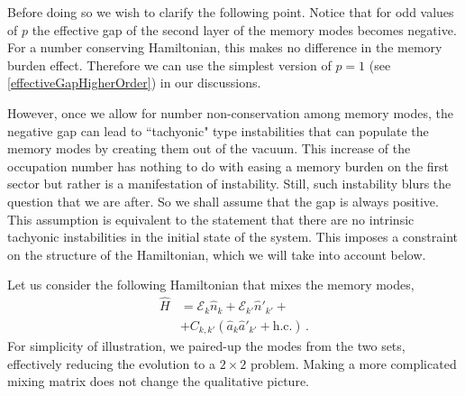 \documentclass[aps,prd,reprint,superscriptaddress,nofootinbib]{revtex4-2}
\begin{document}
  Before doing so we wish to clarify the following point. 
	Notice that for odd values of $p$ the effective gap 
	of the second layer of the memory modes becomes negative. 
	For a number conserving  Hamiltonian, this makes no difference 
	in the memory burden effect. 
	Therefore we can use the 
	simplest version of $p=1$ (see \eqref{effectiveGapHigherOrder}) in our 
discussions. 
	
	However, once we allow for number non-conservation among 
	memory modes, the negative gap can lead to ``tachyonic" type 
	instabilities that can populate the memory modes by creating them   
	out of the vacuum. This increase of the occupation number 
	has nothing to do with easing a memory burden on the first sector but 
	rather is a manifestation of instability.  Still, such instability 
	blurs the  question that we are after. 
	So we shall assume that the gap is always positive. 
	This assumption is equivalent 
	to the statement that there are no intrinsic tachyonic instabilities 
	in the initial state of the system. 
	This imposes a constraint on the structure of the Hamiltonian, which we will take into account below. 
	
	Let us consider the following Hamiltonian that mixes 
	the memory modes,    
	\begin{align}
	\hat{H} &= 
	{\mathcal E}_k \hat{n}_k
	+ {\mathcal E}_{k'}\hat{n}'_{k'} +
	\nonumber\\
	& +  C_{k,k'}\left( \hat{a}_k \hat{a}'_{k'} +  \text{h.c.}\right) \,.
	\label{HAA}
	\end{align}
	For simplicity of illustration,  we paired-up the modes from the two sets, 
	effectively reducing the evolution to a $2\times 2$ problem.  
	Making a more complicated 
	mixing matrix does not change the qualitative picture.
	
\end{document}
